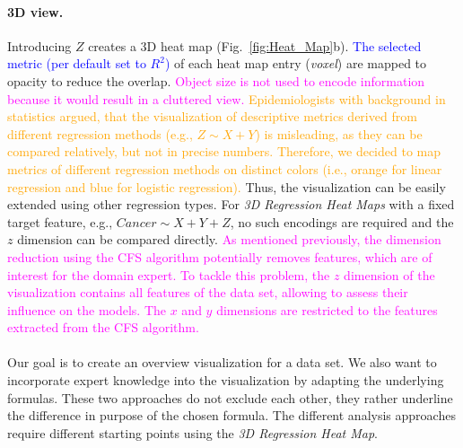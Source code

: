 \documentclass[journal]{style/vgtc} 			          %
\newcommand{\add}[1]{\textcolor{blue}{#1}}
\newcommand{\design}[1]{\textcolor{orange}{#1}}
\newcommand{\magenta}[1]{\textcolor{magenta}{#1}}
\begin{document}
\paragraph{3D view.}
Introducing $Z$ creates a 3D heat map (Fig.~\ref{fig:Heat_Map}b).
\add{The selected metric (per default set to $R^2$)} of each heat map entry (\emph{voxel}) are mapped to opacity to reduce the overlap.
\magenta{Object size is not used to encode information because it would result in a cluttered view.}
\design{
Epidemiologists with background in statistics argued, that the visualization of descriptive metrics derived from different regression methods (e.g., $Z \sim X + Y$) is misleading, as they can be compared relatively, but not in precise numbers.
Therefore, we decided to map metrics of different regression methods on distinct colors (i.e., orange for linear regression and blue for logistic regression).
}
Thus, the visualization can be easily extended using other regression types.
For \emph{3D Regression Heat Maps} with a fixed target feature, e.g., $Cancer \sim X + Y + Z$, no such encodings are required and the $z$ dimension can be compared directly.
\magenta{
As mentioned previously, the dimension reduction using the CFS algorithm potentially removes features, which are of interest for the domain expert.
To tackle this problem, the $z$ dimension of the visualization contains all features of the data set, allowing to assess their influence on the models.
The $x$ and $y$ dimensions are restricted to the features extracted from the CFS algorithm.
}
\\\\
Our goal is to create an overview visualization for a data set.
We also want to incorporate expert knowledge into the visualization by adapting the underlying formulas.
These two approaches do not exclude each other, they rather underline the difference in purpose of the chosen formula.
The different analysis approaches require different starting points using the \emph{3D Regression Heat Map}.
\end{document}
